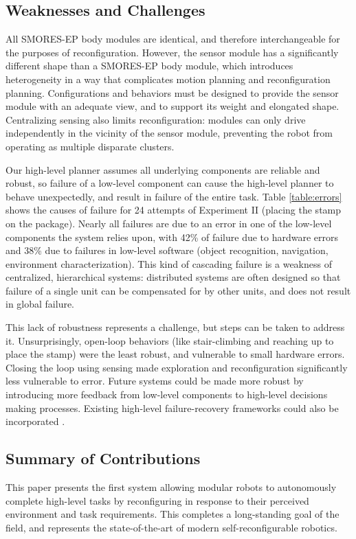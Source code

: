 \documentclass[12pt]{article}
\begin{document}
\subsection{Weaknesses and Challenges}
%
All SMORES-EP body modules are identical, and therefore interchangeable for the purposes of reconfiguration.  However, the sensor module has a significantly different shape than a SMORES-EP body module, which introduces heterogeneity in a way that complicates motion planning and reconfiguration planning.  Configurations and behaviors must be designed to provide the sensor module with an adequate view, and to support its weight and elongated shape.  Centralizing sensing also limits reconfiguration: modules can only drive independently in the vicinity of the sensor module, preventing the robot from operating as multiple disparate clusters. 

Our high-level planner assumes all underlying components are reliable and robust, so failure of a low-level component can cause the high-level planner to behave unexpectedly, and result in failure of the entire task.  Table \ref{table:errors} shows the causes of failure for 24 attempts of Experiment II (placing the stamp on the package).  
Nearly all failures are due to an error in one of the low-level components the system relies upon, with
42\% of failure due to hardware errors and 38\% due to failures in low-level software (object recognition, navigation, environment characterization).
This kind of cascading failure is a weakness of centralized, hierarchical systems: distributed systems are often designed so that failure of a single unit can be compensated for by other units, and does not result in global failure.

This lack of robustness represents a challenge, but steps can be taken to address it.  Unsurprisingly, open-loop behaviors (like stair-climbing and reaching up to place the stamp) were the least robust, and vulnerable to small hardware errors.  Closing the loop using sensing made exploration and reconfiguration significantly less vulnerable to error.  Future systems could be made more robust by introducing more feedback from low-level components to high-level decisions making processes.  Existing high-level failure-recovery frameworks could also be incorporated \cite{Maniatopoulos16icra}. 

\subsection{Summary of Contributions}
%
This paper presents the first system allowing modular robots to autonomously complete high-level tasks by reconfiguring in response to their perceived environment and task requirements.  This completes a long-standing goal of the field, and represents the state-of-the-art of modern self-reconfigurable robotics.
\end{document}
